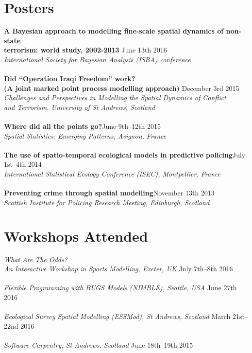 \documentclass[10pt,letter]{article}
\begin{document}
\section*{Posters}
\vspace{1mm}

{\textbf {A Bayesian approach to modelling fine-scale spatial dynamics of non-state\\
 terrorism: world study, 2002-2013 }}\hfill June 13th 2016\\
 {\sl International Society for Bayesian Analysis (ISBA) conference}\\
 \hdashrule[0.5ex]{4cm}{1pt}{1pt}\\
 {\textbf{Did ``Operation Iraqi Freedom'' work? \\
(A joint marked point process modelling approach) }}\hfill December 3rd 2015\\
 {\sl Challenges and Perspectives in Modelling the Spatial Dynamics of Conflict\\ and Terrorism, University of St Andrews, Scotland}\\
 \hdashrule[0.5ex]{4cm}{1pt}{1pt}\\
{\textbf{Where did all the points go?}}\hfill June 9th--12th 2015\\
 {\sl Spatial Statistics: Emerging Patterns, Avignon, France}\\
\hdashrule[0.5ex]{4cm}{1pt}{1pt}\\
 {\textbf{The use of spatio-temporal ecological models in predictive policing}}\hfill July 1st--4th 2014\\
 {\sl International Statistical Ecology Conference (ISEC), Montpellier, France}\\
 \hdashrule[0.5ex]{4cm}{1pt}{1pt}\\
{\textbf{Preventing crime through spatial modelling}}\hfill November 13th 2013\\
 {\sl Scottish Institute for Policing Research Meeting, Edinburgh, Scotland}\\

  
\section*{Workshops Attended}
\vspace{1mm}
{\sl What Are The Odds? \\ An Interactive Workshop in Sports Modelling, Exeter, UK} \hfill July 7th--8th 2016\\
\hdashrule[0.5ex]{4cm}{1pt}{1pt}\\
{\sl Flexible Programming with BUGS Models (NIMBLE), Seattle, USA} \hfill June 27th 2016\\
\hdashrule[0.5ex]{4cm}{1pt}{1pt}\\
{\sl Ecological Survey Spatial Modelling (ESSMod), St Andrews, Scotland} \hfill March 21st--22nd 2016\\
 \hdashrule[0.5ex]{4cm}{1pt}{1pt}\\
 {\sl Software Carpentry, St Andrews, Scotland} \hfill June 18th--19th 2015\\
 \newpage
\end{document}
